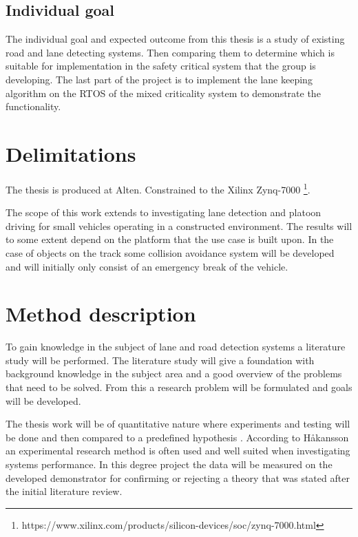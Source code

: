 \subsection{Individual goal}
The individual goal and expected outcome from this thesis is a study of existing road and lane detecting systems. Then comparing them to determine which is suitable for implementation in the safety critical system that the group is developing. The last part of the project is to implement the lane keeping algorithm on the RTOS of the mixed criticality system to demonstrate the functionality.

\section{Delimitations}
The thesis is produced at Alten.
Constrained to the Xilinx Zynq-7000 \footnote{https://www.xilinx.com/products/silicon-devices/soc/zynq-7000.html}.

The scope of this work extends to investigating lane detection and platoon driving for small vehicles operating in a constructed environment. The results will to some extent depend on the platform that the use case is built upon. In the case of objects on the track some collision avoidance system will be developed and will initially only consist of an emergency break of the vehicle.

\section{Method description}
To gain knowledge in the subject of lane and road detection systems a literature study will be performed. The literature study will give a foundation with background knowledge in the subject area and a good overview of the problems that need to be solved. From this a research problem will be formulated and goals will be developed. 

The thesis work will be of quantitative nature where experiments and testing will be done and then compared to a predefined hypothesis \cite{haakansson2013portal}. According to Håkansson \cite{haakansson2013portal} an experimental research method is often used and well suited when investigating systems performance. In this degree project the data will be measured on the developed demonstrator for confirming or rejecting a theory that was stated after the initial literature review.

